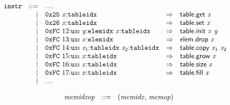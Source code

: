 $$
\begin{array}{@{}l@{}rrlll@{}l@{}}
& {\mathtt{instr}} &::=& \dots \\ &&|&
\mathtt{0x25}~{\mathit{x}}{:}{\mathtt{tableidx}} &\Rightarrow& \mathsf{table.get}~{\mathit{x}} \\ &&|&
\mathtt{0x26}~{\mathit{x}}{:}{\mathtt{tableidx}} &\Rightarrow& \mathsf{table.set}~{\mathit{x}} \\ &&|&
\mathtt{0xFC}~12{:}{\mathtt{u{\scriptstyle32}}}~{\mathit{y}}{:}{\mathtt{elemidx}}~{\mathit{x}}{:}{\mathtt{tableidx}} &\Rightarrow& \mathsf{table.init}~{\mathit{x}}~{\mathit{y}} \\ &&|&
\mathtt{0xFC}~13{:}{\mathtt{u{\scriptstyle32}}}~{\mathit{x}}{:}{\mathtt{elemidx}} &\Rightarrow& \mathsf{elem.drop}~{\mathit{x}} \\ &&|&
\mathtt{0xFC}~14{:}{\mathtt{u{\scriptstyle32}}}~{\mathit{x}}_{{1}}{:}{\mathtt{tableidx}}~{\mathit{x}}_{{2}}{:}{\mathtt{tableidx}} &\Rightarrow& \mathsf{table.copy}~{\mathit{x}}_{{1}}~{\mathit{x}}_{{2}} \\ &&|&
\mathtt{0xFC}~15{:}{\mathtt{u{\scriptstyle32}}}~{\mathit{x}}{:}{\mathtt{tableidx}} &\Rightarrow& \mathsf{table.grow}~{\mathit{x}} \\ &&|&
\mathtt{0xFC}~16{:}{\mathtt{u{\scriptstyle32}}}~{\mathit{x}}{:}{\mathtt{tableidx}} &\Rightarrow& \mathsf{table.size}~{\mathit{x}} \\ &&|&
\mathtt{0xFC}~17{:}{\mathtt{u{\scriptstyle32}}}~{\mathit{x}}{:}{\mathtt{tableidx}} &\Rightarrow& \mathsf{table.fill}~{\mathit{x}} \\ &&|&
\dots \\
\end{array}
$$

\vspace{1ex}

$$
\begin{array}{@{}lrrl@{}l@{}}
& {\mathit{memidxop}} &::=& ({\mathit{memidx}},\, {\mathit{memop}}) \\
\end{array}
$$

